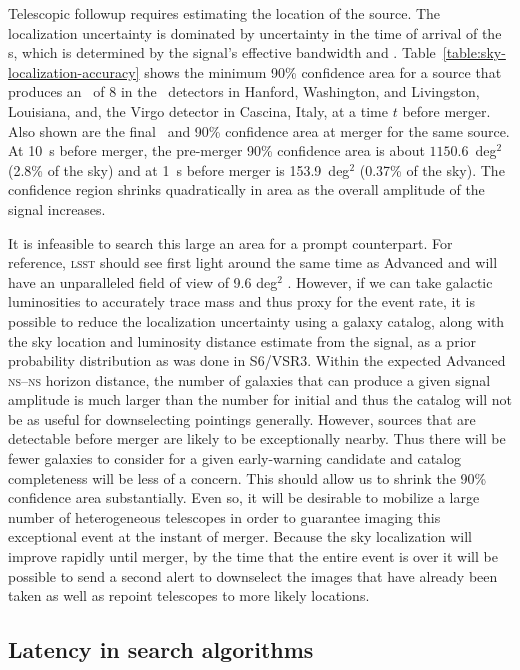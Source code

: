 Telescopic followup requires estimating the location of the \GW{} source. The
localization uncertainty is dominated by uncertainty in the time of arrival of
the \GW{}s, which is determined by the signal's effective bandwidth and \SNR{}
\citep{Fairhurst2009}.  Table~\ref{table:sky-localization-accuracy} shows the
minimum 90\% confidence area for a source that produces an \SNR\ of 8 in the
\LIGO\ detectors in Hanford, Washington, and Livingston, Louisiana, and, the
Virgo detector in Cascina, Italy, at a time $t$ before merger.  Also shown are
the final \SNR\ and 90\% confidence area at merger for the same source.
At 10~s before merger, the pre-merger 90\% confidence area is about $1150.6$~deg$^2$
(2.8\% of the sky) and at 1~s before merger is 153.9~deg$^2$ (0.37\% of the sky).
The confidence region shrinks quadratically in area as the overall amplitude of the
signal increases.

It is infeasible to search this large an area for a prompt counterpart. For
reference, \textsc{lsst} should see first light around the same time as
Advanced \LIGO{} and will have an unparalleled field of view of 9.6 deg$^2$
\citep{2008arXiv0805.2366I}.  However, if we can take galactic luminosities
to accurately trace mass and thus proxy for the \CBC{} event rate, it is
possible to reduce the localization uncertainty using a galaxy catalog, along
with the sky location and luminosity distance estimate from the \GW{} signal,
as a prior probability distribution \citep{galaxy-catalog} as was done in
S6/VSR3. Within the expected Advanced \LIGO{} \textsc{ns}--\textsc{ns} horizon
distance, the number of galaxies that can produce a given signal
amplitude is much larger than the number for initial \LIGO{} and thus the
catalog will not be as useful for downselecting pointings generally. However,
sources that are detectable before merger are likely to be exceptionally
nearby. Thus there will be fewer galaxies to consider for a given
early-warning candidate and catalog completeness will be less of a concern.
This should allow us to shrink the 90\% confidence area substantially.
Even so, it will be desirable to mobilize a large number of heterogeneous
telescopes in order to guarantee imaging this exceptional event at the instant
of merger. Because the sky localization will improve rapidly until merger,
by the time that the entire \CBC{} event is over it will be
possible to send a second alert to downselect the images that have already been
taken as well as repoint telescopes to more likely locations.

\subsection{Latency in \CBC{} search algorithms}

